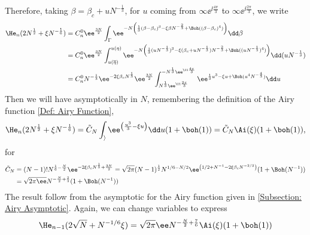 Therefore, taking $\beta = \beta_c + u N^{-\frac{1}{3}}$, for $u$ coming from $\infty \ee^{\ii \frac{4\pi}{3}}$ to $\infty \ee^{\ii \frac{2\pi}{3}}$, we write
\begin{align}
	\He_n(2 N^{\frac{1}{2}} + \xi N^{-\frac{1}{6}}) & = 
	C_n^0 \ee^{\frac{3N}{2}} 
	\int_{\Gamma}  
	\ee^{-N 
	\left(
	\frac{1}{3}(\beta - \beta_c)^3 - \xi \beta N^{-\frac{2}{3}} + \Boh((\beta - \beta_c)^4) 
	\right)}
	\dd \beta 
	\\
 	& = C_n^0 \ee^{\frac{3N}{2}} 
 	\int_{u(\overline{\eta})}^{u(\eta)}
 	\ee^{-N \left(\frac{1}{3}(u N^{-\frac{1}{3}})^3 - \xi (\beta_c + u N^{-\frac{1}{3}}) N^{-\frac{2}{3}} + 
 	\Boh((u N^{-\frac{1}{3}})^4) \right)} \dd (u N^{-\frac{1}{3}})
 	\\
	& = C_n^0 N^{-\frac{1}{3}} \ee^{-2\xi\beta_c N^{\frac{1}{3}}} \ee^{\frac{3N}{2}}
	\int_{N^{\frac{1}{3}} \ee^{\ii \frac{2\pi}{3}}}^{-N^{\frac{1}{3}} \ee^{\ii \frac{4\pi}{3}}}  \ee^{\frac{1}{3} u^3 - \xi u + \Boh(u^4 N^{-\frac{4}{3}})} \dd u
\end{align}
Then we will have asymptotically in $N$, remembering the definition of the Airy function \ref{Def: Airy Function},
\begin{equation}
	\He_n(2N^{\frac{1}{2}} + \xi N^{-\frac{1}{6}}) = \tilde{C}_N \int_{\rangle}  \ee^{\left(\frac{u^3}{3} - \xi u\right)} \dd u (1 + \boh(1)) = \tilde{C}_N \Ai(\xi) (1 + \boh(1)),
\end{equation}
for
\begin{align}
	\tilde{C}_N & = (N-1)! N^{\frac{1}{6} - \frac{N}{2}} \ee^{-2\xi\beta_c N^{\frac{1}{3}} + \frac{3N}{2}} = \sqrt{2\pi} (N-1)^{\frac{1}{2}} N^{1/6 - N/2} \ee^{\left(1/2 + N^{-1} - 2\xi \beta_c N^{-2/3} \right)} (1 + \Boh(N^{-1})) \\
	& = \sqrt{2\pi\ee} N^{-\frac{N}{2} + \frac{2}{3}} (1 + \Boh(N^{-1})) 
\end{align} 
The result follow from the asymptotic for the Airy function given in \ref{Subsection: Airy Asymptotic}. Again, we can change variables to express
\begin{equation}
	\He_{n-1}(2\sqrt{N} + N^{-1/6}\xi) = \sqrt{2\pi} \ee N^{-\frac{N}{2} + \frac{7}{6}}  \Ai(\xi) (1 + \boh(1))
\end{equation}

